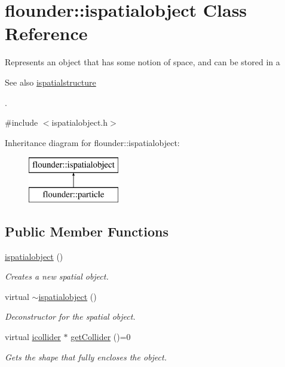 \hypertarget{classflounder_1_1ispatialobject}{}\section{flounder\+:\+:ispatialobject Class Reference}
\label{classflounder_1_1ispatialobject}


Represents an object that has some notion of space, and can be stored in a \begin{DoxySeeAlso}{See also}
\hyperlink{classflounder_1_1ispatialstructure}{ispatialstructure}


\end{DoxySeeAlso}
.  




{\ttfamily \#include $<$ispatialobject.\+h$>$}

Inheritance diagram for flounder\+:\+:ispatialobject\+:\begin{figure}[H]
\begin{center}
\leavevmode
\includegraphics[height=2.000000cm]{classflounder_1_1ispatialobject}
\end{center}
\end{figure}
\subsection*{Public Member Functions}
\begin{DoxyCompactItemize}
\item 
\hyperlink{classflounder_1_1ispatialobject_ad0a12c2658487000d8a00ce24df04e77}{ispatialobject} ()
\begin{DoxyCompactList}\small\item\em Creates a new spatial object. \end{DoxyCompactList}\item 
virtual \hyperlink{classflounder_1_1ispatialobject_aa382517fbb4b23ea482988fbd2d267ad}{$\sim$ispatialobject} ()
\begin{DoxyCompactList}\small\item\em Deconstructor for the spatial object. \end{DoxyCompactList}\item 
virtual \hyperlink{classflounder_1_1icollider}{icollider} $\ast$ \hyperlink{classflounder_1_1ispatialobject_af3867cbb5f35b0296a16af77703e6c81}{get\+Collider} ()=0
\begin{DoxyCompactList}\small\item\em Gets the shape that fully encloses the object. \end{DoxyCompactList}\end{DoxyCompactItemize}


